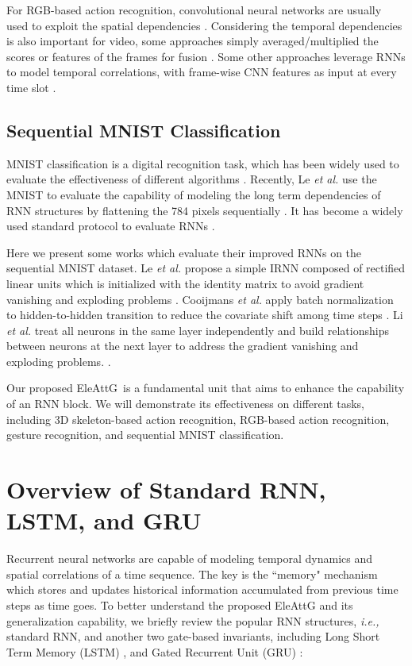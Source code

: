 \documentclass[journal]{IEEEtran}
\newcommand{\EleAttG}{{EleAttG~}}
\begin{document}
For RGB-based action recognition, convolutional neural networks are usually used to exploit the spatial dependencies \cite{simonyan2014two,wang2016temporal,yue2015beyond,donahue2015long}. Considering the temporal dependencies is also important for video, some approaches simply averaged/multiplied the scores or features of the frames for fusion \cite{simonyan2014two,wang2016temporal,diba2017deeptemporal}. Some other approaches leverage RNNs to model temporal correlations, with frame-wise CNN features as input at every time slot \cite{yue2015beyond,donahue2015long}. 

\subsection{Sequential MNIST Classification}
\label{sec:mnist}
MNIST classification is a digital recognition task, which has been widely used to evaluate the effectiveness of different algorithms \cite{lecun1998gradient}. Recently, Le {\it et al.} use the MNIST to evaluate the capability of modeling the long term dependencies of RNN structures by flattening the 784 pixels sequentially \cite{le2015simple}. It has become a widely used standard protocol to evaluate RNNs \cite{arjovsky2016unitary,cooijmans2016recurrent,campos2018skip,li2018independently}. 

Here we present some works which evaluate their improved RNNs on the sequential MNIST dataset. Le {\it et al.} propose a simple IRNN composed of rectified linear units which is initialized with the identity matrix to avoid gradient vanishing and exploding problems \cite{le2015simple}. Cooijmans {\it et al.} apply batch normalization to hidden-to-hidden transition to reduce the covariate shift among time steps \cite{cooijmans2016recurrent}. Li {\it et al.} treat all neurons in the same layer independently and build relationships between neurons at the next layer to address the gradient vanishing and exploding problems. \cite{li2018independently}. 


Our proposed \EleAttG is a fundamental unit that aims to enhance the capability of an RNN block. We will demonstrate its effectiveness on different tasks, including 3D skeleton-based action recognition, RGB-based action recognition, gesture recognition, and sequential MNIST classification.
		
\section{Overview of Standard RNN, LSTM, and GRU}
\label{sec:RNN} 
Recurrent neural networks are capable of modeling temporal dynamics and spatial correlations of a time sequence. The key is the ``memory" mechanism which stores and updates historical information accumulated from previous time steps as time goes. To better understand the proposed EleAttG and its generalization capability, we briefly review the popular RNN structures, {\it i.e.,} standard RNN, and another two gate-based invariants, including Long Short Term Memory (LSTM) \cite{hochreiter1997long}, and Gated Recurrent Unit (GRU) \cite{cho14}:
\end{document}
